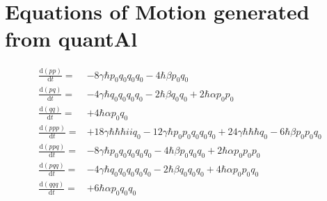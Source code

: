 \documentclass{article}
\newcommand{\ui}{i}          %
\begin{document}
\section{Equations of Motion generated from quantAl}

\begin{equation}
\begin{split}
\frac{\mathrm{d}(pp)}{\mathrm{d}t} = & -8 \gamma \hbar p_{0}q_{0}q_{0}q_{0}-4 \hbar \beta p_{0}q_{0} \\
\frac{\mathrm{d}(pq)}{\mathrm{d}t} = & -4 \gamma \hbar q_{0}q_{0}q_{0}q_{0}-2 \hbar \beta q_{0}q_{0}+2 \hbar \alpha p_{0}p_{0} \\
\frac{\mathrm{d}(qq)}{\mathrm{d}t} = & +4 \hbar \alpha p_{0}q_{0} \\
\frac{\mathrm{d}(ppp)}{\mathrm{d}t} = & +18 \gamma \hbar \hbar \hbar \ui \ui q_{0}-12 \gamma \hbar p_{0}p_{0}q_{0}q_{0}q_{0}+24 \gamma \hbar \hbar \hbar q_{0}-6 \hbar \beta p_{0}p_{0}q_{0} \\
\frac{\mathrm{d}(ppq)}{\mathrm{d}t} = & -8 \gamma \hbar p_{0}q_{0}q_{0}q_{0}q_{0}-4 \hbar \beta p_{0}q_{0}q_{0}+2 \hbar \alpha p_{0}p_{0}p_{0} \\
\frac{\mathrm{d}(pqq)}{\mathrm{d}t} = & -4 \gamma \hbar q_{0}q_{0}q_{0}q_{0}q_{0}-2 \hbar \beta q_{0}q_{0}q_{0}+4 \hbar \alpha p_{0}p_{0}q_{0} \\
\frac{\mathrm{d}(qqq)}{\mathrm{d}t} = & +6 \hbar \alpha p_{0}q_{0}q_{0}
\end{split}
\end{equation}
\end{document}
